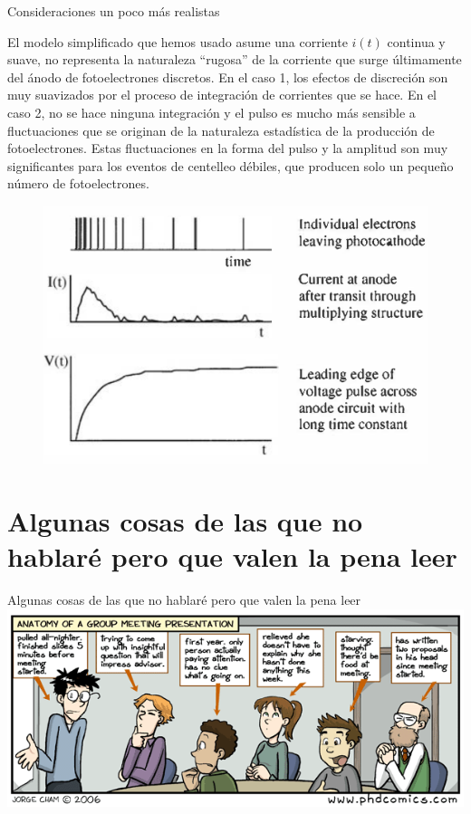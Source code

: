\documentclass[a4paper,10pt]{beamer}
\begin{document}
\begin{frame}{Consideraciones un poco más realistas}

\begin{justify}
\small
El modelo simplificado que hemos usado asume una corriente $i(t)$ continua y suave, 
no representa la naturaleza ``rugosa'' de la corriente que surge últimamente 
del ánodo de fotoelectrones discretos. En el caso 1, los efectos de discreción 
son muy suavizados por el proceso de integración de corrientes que se hace. En el 
caso 2, no se hace ninguna integración y el pulso es mucho más sensible a fluctuaciones 
que se originan de la naturaleza estadística de la producción de fotoelectrones. Estas 
fluctuaciones en la forma del pulso y la amplitud son muy significantes para los eventos 
de centelleo débiles, que producen solo un pequeño número de fotoelectrones.
\end{justify}

\begin{figure}
 \center
 \includegraphics[scale=0.38]{fig47}
\end{figure}
\end{frame}

\section{Algunas cosas de las que no hablaré pero que valen la pena leer}

\begin{frame}
\begin{center}
 {\huge{\color{blue}Algunas cosas de las que no hablaré pero que valen la pena leer}} \\
 \vspace{0.5cm}
 \includegraphics[scale=0.54]{fig48}
\end{center}
\end{frame}
\end{document}
